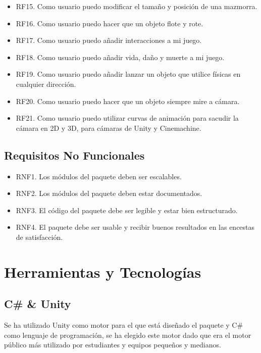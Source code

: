 \begin{itemize}
    \item RF15. Como usuario puedo modificar el tamaño y posición de una mazmorra.
    \item RF16. Como usuario puedo hacer que un objeto flote y rote.
    \item RF17. Como usuario puedo añadir interacciones a mi juego.
    \item RF18. Como usuario puedo añadir vida, daño y muerte a mi juego.
    \item RF19. Como usuario puedo añadir lanzar un objeto que utilice físicas en cualquier dirección.
    \item RF20. Como usuario puedo hacer que un objeto siempre mire a cámara.
    \item RF21. Como usuario puedo utilizar curvas de animación para sacudir la cámara en 2D y 3D, para cámaras de Unity y Cinemachine.
\end{itemize}

\subsection{Requisitos No Funcionales}

\begin{itemize}
    \item RNF1. Los módulos del paquete deben ser escalables.
    \item RNF2. Los módulos del paquete deben estar documentados.
    \item RNF3. El código del paquete debe ser legible y estar bien estructurado.
    \item RNF4. El paquete debe ser usable y recibir buenos resultados en las encestas de satisfacción.
\end{itemize}

\section{Herramientas y Tecnologías}

\subsection{C\# \& Unity}

Se ha utilizado Unity\cite{unity} como motor para el que está diseñado el paquete y C\#\cite{csharp} como lenguaje de programación, se ha elegido este motor dado que era el motor público más utilizado por estudiantes y equipos pequeños y medianos.

